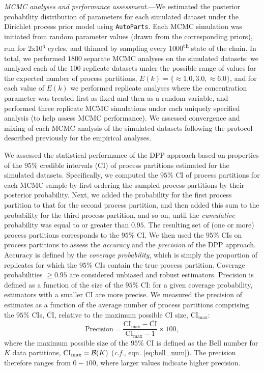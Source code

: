 \documentclass[11pt]{article}
\begin{document}
\bigskip
\noindent
{\it MCMC analyses and performance assessment.}---We estimated the posterior probability distribution of parameters for each simulated dataset under the Dirichlet process prior model using \verb!AutoParts!.
Each MCMC simulation was initiated from random parameter values (drawn from the corresponding priors), run for 2x10$^6$ cycles, and thinned by sampling every $1000$\textsuperscript{th} state of the chain.
In total, we performed $1800$ separate MCMC analyses on the simulated datasets: we analyzed each of the $100$ replicate datasets under the possible range of values for the expected number of process partitions, $E(k)=\{\approx 1.0, 3.0, \approx 6.0\}$, and for each value of $E(k)$ we performed replicate analyses where the concentration parameter was treated first as fixed and then as a random variable, and performed three replicate MCMC simulations under each uniquely specified analysis (to help assess MCMC performance).  
We assessed convergence and mixing of each MCMC analysis of the simulated datasets following the protocol described previously for the empirical analyses. 

We assessed the statistical performance of the DPP approach based on properties of the $95\%$ credible intervals (CI) of process partitions estimated for the simulated datasets.  
Specifically, we computed the $95\%$ CI of process partitions for each MCMC sample by first ordering the sampled process partitions by their posterior probability.
Next, we added the probability for the first process partition to that for the second process partition, and then added this sum to the probability for the third process partition, and so on, until the \emph{cumulative} probability was equal to or greater than $0.95$.
The resulting set of (one or more) process partitions corresponds to the $95\%$ CI. 
We then used the $95\%$ CIs on process partitions to assess the \emph{accuracy} and the \emph{precision} of the DPP approach. 
Accuracy is defined by the \emph{coverage probability}, which is simply the proportion of replicates for which the $95\%$ CIs contain the true process partition.
Coverage probabilities $\geq 0.95$ are considered unbiased and robust estimators.
Precision is defined as a function of the size of the $95\%$ CI: for a given coverage probability, estimators with a smaller CI are more precise.
We measured the precision of estimates as a function of the average number of process partitions comprising the $95\%$ CIs, $\overline{\text{CI}}$, relative to the maximum possible CI size, $\text{CI}_{\text{max}}$: 
$$
\text{Precision} = \frac{\text{CI}_{\text{max}}-\overline{\text{CI}}}{{\text{CI}_{\text{max}}}-1} \times 100,
$$
\noindent
where the maximum possible size of the $95\%$ CI is defined as the Bell number for $K$ data partitions, $\text{CI}_{\text{max}} = {\cal B}(K)$ (\emph{c.f.}, eqn. \ref{eq:bell_num}).
The precision therefore ranges from $0-100$, where larger values indicate higher precision.
\end{document}
